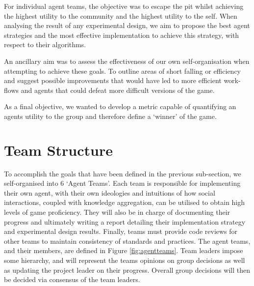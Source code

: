 For individual agent teams, the objective was to escape the pit whilst achieving the highest utility to the community and the highest utility to the self. When analysing the result of any experimental design, we aim to propose the best agent strategies and the most effective implementation to achieve this strategy, with respect to their algorithms. 

An ancillary aim was to assess the effectiveness of our own self-organisation when attempting to achieve these goals. To outline areas of short falling or efficiency and suggest possible improvements that would have led to more efficient work-flows and agents that could defeat more difficult versions of the game. 

As a final objective, we wanted to develop a metric capable of quantifying an agents utility to the group and therefore define a `winner' of the game. 



\section{Team Structure}\label{sec:team struct}

To accomplish the goals that have been defined in the previous sub-section, we self-organised into 6 `Agent Teams'. Each team is responsible for implementing their own agent, with their own ideologies and intuitions of how social interactions, coupled with knowledge aggregation, can be utilised to obtain high levels of game proficiency. They will also be in charge of documenting their progress and ultimately writing a report detailing their implementation strategy and experimental design results. Finally, teams must provide code reviews for other teams to maintain consistency of standards and practices. The agent teams, and their members, are defined in Figure \ref{fig:agentteams}. Team leaders impose some hierarchy, and will represent the teams opinions on group decisions as well as updating the project leader on their progress. Overall group decisions will then be decided via consensus of the team leaders. 

